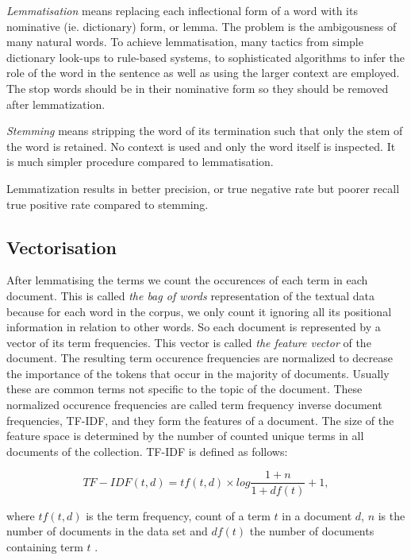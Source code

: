 \emph{Lemmatisation} means replacing each inflectional form of a 
word with its nominative (ie. dictionary) form, or lemma. 
The problem is the ambigousness of many natural words. To 
achieve lemmatisation, many tactics from simple dictionary look-ups to 
rule-based systems, to sophisticated algorithms to infer the role 
of the word in the sentence as well as using the larger context are
employed. The stop words should be in their nominative form so they 
should be removed after lemmatization.

\emph{Stemming} means stripping the word of its termination such 
that only the stem of the word is retained. No context is used 
and only the word itself is inspected. It is much simpler procedure
compared to lemmatisation.

Lemmatization results in better precision, or true negative rate 
but poorer recall true positive rate compared to stemming. 
\cite{manning_introduction_2008}


\subsection{Vectorisation}
After lemmatising the terms we count the occurences of each term 
in each document. This is called \emph{the bag of words} 
representation of the textual data because for each word in the 
corpus, we only count it ignoring all its positional information 
in relation to other words. So each document is represented by
a vector of its term frequencies. This vector is called \emph{the 
feature vector} of the document. 
The resulting term occurence 
frequencies are normalized to decrease the importance of the 
tokens that occur in the majority of documents. Usually these are 
common terms not specific to the topic of the document. 
These normalized occurence frequencies are called term 
frequency inverse document frequencies, TF-IDF, and 
they form the features of a document. The size of the feature 
space is determined by the number of counted unique terms in all 
documents of the collection. 
TF-IDF is defined as follows:

\begin{equation}
 TF-IDF(t,d) = tf(t,d) \times log \frac{1+n}{1+df(t)} + 1,
\end{equation}

where $tf(t,d)$ is the term frequency, count of a term $t$ in a 
document $d$, $n$ is the number of documents in the data set and 
$df(t)$ the number of documents containing term $t$ 
\cite{luhn_statistical_1957} \cite{jones_statistical_1972}.


